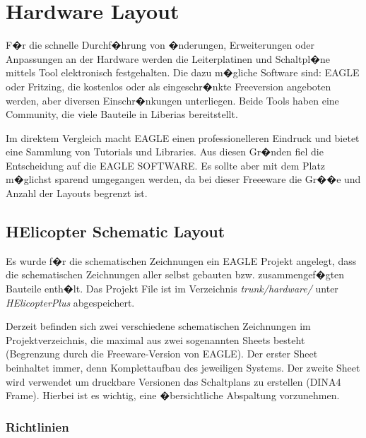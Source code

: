 \section{Hardware Layout}
F�r die schnelle Durchf�hrung von �nderungen, Erweiterungen oder Anpassungen an der Hardware werden die Leiterplatinen und Schaltpl�ne mittels Tool elektronisch festgehalten. Die dazu m�gliche Software sind: EAGLE oder Fritzing,
die kostenlos oder als eingeschr�nkte Freeversion angeboten werden, aber diversen Einschr�nkungen unterliegen. Beide Tools haben eine Community, die viele Bauteile in Liberias bereitstellt. 

Im direktem Vergleich macht EAGLE einen professionelleren Eindruck und bietet eine Sammlung von Tutorials und Libraries. Aus diesen Gr�nden fiel die Entscheidung auf die EAGLE SOFTWARE. Es sollte aber mit dem Platz m�glichst sparend umgegangen werden, da bei dieser Freeeware die Gr��e und Anzahl der Layouts begrenzt ist.

\subsection{HElicopter Schematic Layout}

Es wurde f�r die schematischen Zeichnungen ein EAGLE Projekt angelegt, dass die schematischen Zeichnungen aller selbst gebauten bzw. zusammengef�gten Bauteile enth�lt. Das Projekt File ist im Verzeichnis \textit{trunk/hardware/} unter \textit{HElicopterPlus} abgespeichert.

Derzeit befinden sich zwei verschiedene schematischen Zeichnungen im Projektverzeichnis, die maximal aus zwei sogenannten Sheets besteht (Begrenzung durch die Freeware-Version von EAGLE). Der erster Sheet beinhaltet immer, denn Komplettaufbau des jeweiligen Systems. Der zweite Sheet wird verwendet um druckbare Versionen das Schaltplans zu erstellen (DINA4 Frame). Hierbei ist es wichtig, eine �bersichtliche Abspaltung vorzunehmen. 


\newpage



\subsubsection{Richtlinien\cite{doc:guidelinesSchematics}}

